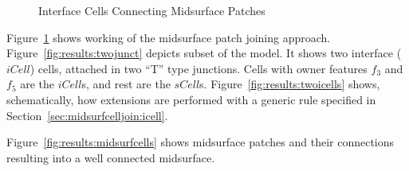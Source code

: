 \begin{figure}[!h]
\centering     %
{} \quad
{}
\caption{Interface Cells Connecting Midsurface Patches}
\label{fig:results:icellsjoining}
\end{figure}



Figure~\ref{fig:results:icellsjoining} shows working of the midsurface patch joining approach. Figure~\ref{fig:results:twojunct} depicts subset of the model. It shows two interface ($iCell$) cells, attached in two ``T'' type junctions. Cells with owner features $f_3$ and $f_5$ are the $iCell$s, and rest are the $sCell$s. Figure~\ref{fig:results:twoicells} shows, schematically, how extensions are performed with a generic rule specified in Section~\ref{sec:midsurfcelljoin:icell}.


Figure~\ref{fig:results:midsurfcells} shows midsurface patches and their connections resulting into a well connected midsurface. 






